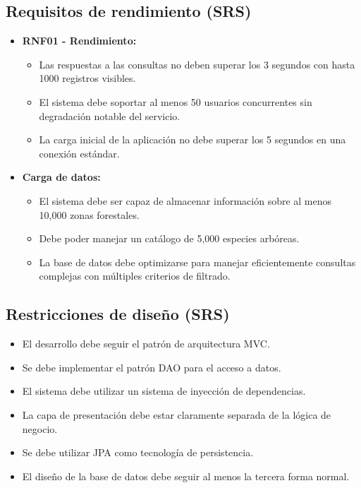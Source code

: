 \subsection{Requisitos de rendimiento (SRS)}
\label{srs:rendimiento}
\begin{itemize}
\item \textbf{RNF01 - Rendimiento:}
  \begin{itemize}
  \item Las respuestas a las consultas no deben superar los 3 segundos con hasta 1000 registros visibles.
  \item El sistema debe soportar al menos 50 usuarios concurrentes sin degradación notable del servicio.
  \item La carga inicial de la aplicación no debe superar los 5 segundos en una conexión estándar.
  \end{itemize}
\item \textbf{Carga de datos:}
  \begin{itemize}
  \item El sistema debe ser capaz de almacenar información sobre al menos 10,000 zonas forestales.
  \item Debe poder manejar un catálogo de 5,000 especies arbóreas.
  \item La base de datos debe optimizarse para manejar eficientemente consultas complejas con múltiples criterios de filtrado.
  \end{itemize}
\end{itemize}

\subsection{Restricciones de diseño (SRS)}
\label{srs:restriccionesDiseño}
\begin{itemize}
\item El desarrollo debe seguir el patrón de arquitectura MVC.
\item Se debe implementar el patrón DAO para el acceso a datos.
\item El sistema debe utilizar un sistema de inyección de dependencias.
\item La capa de presentación debe estar claramente separada de la lógica de negocio.
\item Se debe utilizar JPA como tecnología de persistencia.
\item El diseño de la base de datos debe seguir al menos la tercera forma normal.
\end{itemize}

